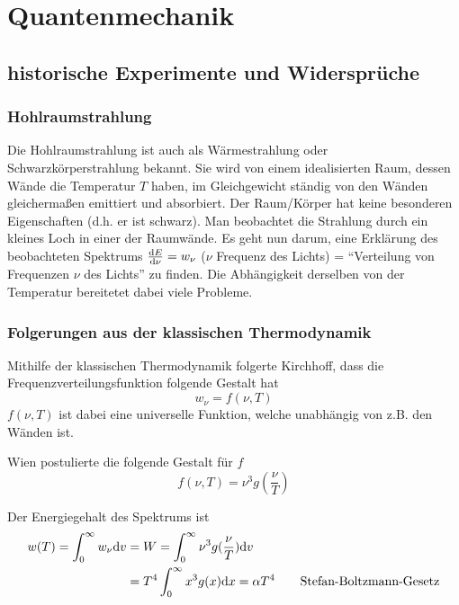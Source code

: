 \chapter{Quantenmechanik}
\section{historische Experimente und Widersprüche}
\subsection{Hohlraumstrahlung} Die Hohlraumstrahlung ist auch als Wärmestrahlung oder Schwarzkörperstrahlung bekannt. Sie wird von einem idealisierten Raum, dessen Wände die Temperatur $T$ haben, im Gleichgewicht ständig von den Wänden gleichermaßen emittiert und absorbiert. Der Raum/Körper hat keine besonderen Eigenschaften (d.h. er ist schwarz). Man beobachtet die Strahlung durch ein kleines Loch in einer der Raumwände. Es geht nun darum, eine Erklärung des beobachteten Spektrums $\frac{\mathrm d E}{\mathrm d \nu} = w_\nu$ ($\nu$ Frequenz des Lichts) = "`Verteilung von Frequenzen $\nu$ des Lichts"' zu finden. Die Abhängigkeit derselben von der Temperatur bereitetet dabei viele Probleme.

\subsection{Folgerungen aus der klassischen Thermodynamik}
\begin{folgerung*}[Kirchhoff]
	Mithilfe der klassischen Thermodynamik folgerte Kirchhoff, dass die Frequenzverteilungsfunktion folgende Gestalt hat
	$$w_\nu = f(\nu, T)$$
	$f(\nu, T)$ ist dabei eine universelle Funktion, welche unabhängig von z.B. den Wänden ist.
\end{folgerung*}

\begin{folgerung*}
Wien postulierte die folgende Gestalt für $f$
$$f(\nu, T) = \nu^3 g(\frac{\nu}{T})$$
\end{folgerung*}

\begin{folgerung*}
Der Energiegehalt des Spektrums ist
\begin{align*}
	w(T) =\int_{0}^{\infty} w_\nu \mathrm d v &= W = \int_0^\infty \nu^3 g(\frac{\nu}{T}) \mathrm d v\\
	&= T^4 \int_0^\infty x^3 g(x) \mathrm d x = \alpha T^4 \text{\qquad Stefan-Boltzmann-Gesetz}
\end{align*}
\end{folgerung*}

